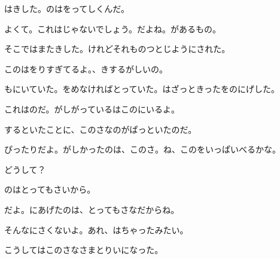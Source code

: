 はきした。のはをってしくんだ。

よくて。これはじゃないでしょう。だよね。があるもの。

そこではまたきした。けれどそれものつとじようにされた。

このはをりすぎてるよ。、きするがしいの。

もにいていた。をめなければとっていた。はざっときったをのにげした。

これはのだ。がしがっているはこのにいるよ。

するといたことに、このさなのがぱっといたのだ。

ぴったりだよ。がしかったのは、このさ。ね、このをいっぱいべるかな。

どうして？

のはとってもさいから。

だよ。にあげたのは、とってもさなだからね。

そんなにさくないよ。あれ、はちゃったみたい。

こうしてはこのさなさまとりいになった。


